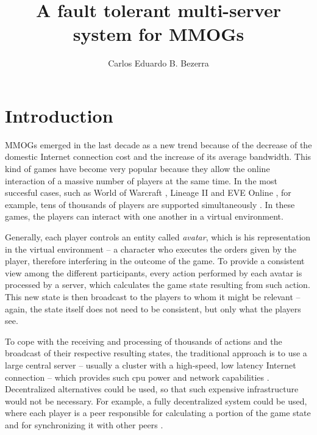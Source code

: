 \documentclass[]{usiinfprospectus}
\author{Carlos Eduardo B. Bezerra}
\title{A fault tolerant multi-server system for MMOGs}
\begin{document}
\maketitle

\section{Introduction} \label{sec:introduction}

MMOGs emerged in the last decade as a new trend because of the decrease of the domestic Internet connection cost and the increase of its average bandwidth. This kind of games have become very popular because they allow the online interaction of a massive number of players at the same time. In the most succesful cases, such as World of Warcraft \cite{worldofwarcraft}, Lineage II \cite{lineage2} and EVE Online \cite{eveonline}, for example, tens of thousands of players are supported simultaneously \cite{chen2006pch}. In these games, the players can interact with one another in a virtual environment.

Generally, each player controls an entity called \emph{avatar}, which is his representation in the virtual environment -- a character who executes the orders given by the player, therefore interfering in the outcome of the game. To provide a consistent view among the different participants, every action performed by each avatar is processed by a server, which calculates the game state resulting from such action. This new state is then broadcast to the players to whom it might be relevant -- again, the state itself does not need to be consistent, but only what the players see.

To cope with the receiving and processing of thousands of actions and the broadcast of their respective resulting states, the traditional approach is to use a large central server -- usually a cluster with a high-speed, low latency Internet connection -- which provides such cpu power and network capabilities \cite{feng2007wnn}. Decentralized alternatives could be used, so that such expensive infrastructure would not be necessary. For example, a fully decentralized system could be used, where each player is a peer responsible for calculating a portion of the game state and for synchronizing it with other peers \cite{rieche2007ppb, hampel2006ppa, elrhalibi2005abm, iimura2004zfg, knutsson2004pps}.
\end{document}
